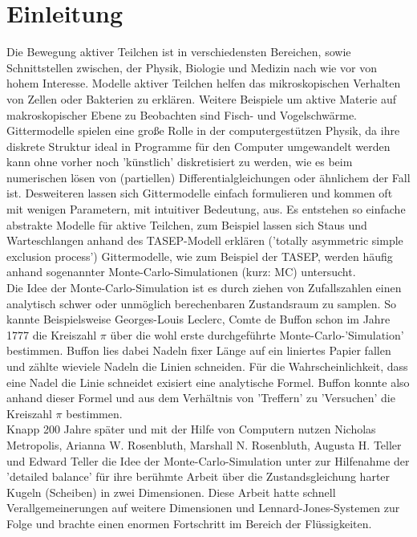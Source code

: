 \documentclass[a4paper, 12pt]{report}
\begin{document}
\chapter{Einleitung}
\renewcommand{\thepage}{\arabic{page}}\setcounter{page}{1}
Die Bewegung aktiver Teilchen ist in verschiedensten Bereichen, sowie \break Schnittstellen zwischen, der Physik, Biologie und Medizin nach wie vor von hohem Interesse. Modelle aktiver Teilchen helfen das mikroskopischen Verhalten von Zellen oder Bakterien zu erklären. Weitere Beispiele um aktive Materie auf makroskopischer Ebene zu Beobachten sind Fisch- und Vogelschwärme.
\\
\noindent Gittermodelle spielen eine große Rolle in der computergestützen Physik, da ihre diskrete Struktur ideal in Programme für den Computer umgewandelt werden kann ohne vorher noch 'künstlich' diskretisiert zu werden, wie es beim numerischen lösen von (partiellen) Differentialgleichungen oder ähnlichem der Fall ist. Desweiteren lassen sich Gittermodelle einfach formulieren und kommen oft mit wenigen Parametern, mit intuitiver Bedeutung, aus. Es entstehen so einfache abstrakte Modelle für aktive Teilchen, zum Beispiel lassen sich Staus und Warteschlangen anhand des TASEP-Modell erklären ('totally asymmetric simple exclusion process')\cite{Derrida_1993} Gittermodelle, wie zum Beispiel der TASEP, werden häufig anhand sogenannter Monte-Carlo-Simulationen (kurz: MC) untersucht. 
\\
\noindent Die Idee der Monte-Carlo-Simulation ist es durch ziehen von Zufallszahlen einen analytisch schwer oder unmöglich berechenbaren Zustandsraum zu samplen. So kannte Beispielsweise Georges-Louis Leclerc, Comte de Buffon schon im Jahre 1777 die Kreiszahl $\pi$ über die wohl erste durchgeführte Monte-Carlo-'Simulation' bestimmen. Buffon lies dabei Nadeln fixer Länge auf ein liniertes Papier fallen und zählte wieviele Nadeln die Linien schneiden. Für die Wahrscheinlichkeit, dass eine Nadel die Linie schneidet exisiert eine analytische Formel. Buffon konnte also anhand dieser Formel und aus dem Verhältnis von 'Treffern' zu 'Versuchen' die Kreiszahl $\pi$ bestimmen\cite{Buffon}. 
\\
\noindent Knapp 200 Jahre später und mit der Hilfe von Computern nutzen Nicholas Metropolis, Arianna W. Rosenbluth, Marshall N. Rosenbluth, Augusta H. Teller und Edward Teller die Idee der Monte-Carlo-Simulation unter zur Hilfenahme der 'detailed balance' für ihre berühmte Arbeit über die Zustandsgleichung harter Kugeln (Scheiben) in zwei Dimensionen\cite{doi:10.1063/1.1699114}. Diese Arbeit hatte schnell Verallgemeinerungen auf weitere Dimensionen und Lennard-Jones-Systemen\cite{doi:10.1063/1.462271} zur Folge und brachte einen enormen Fortschritt im Bereich der Flüssigkeiten.
\end{document}
